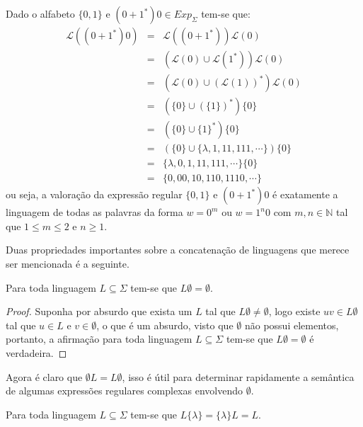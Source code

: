 \begin{exemplo}\label{exe:ValoracaoExpressao2}
	Dado o alfabeto $\{0,1\}$ e $(0 + 1^*)0 \in Exp_\Sigma$ tem-se que:
	\begin{eqnarray*}
		\mathcal{L}((0 + 1^*)0 ) & = & \mathcal{L}((0 + 1^*))\mathcal{L}(0)\\
		& = & (\mathcal{L}(0) \cup  \mathcal{L}(1^*))\mathcal{L}(0)\\
    & = & (\mathcal{L}(0) \cup  (\mathcal{L}(1))^*)\mathcal{L}(0)\\
    & = & (\{0\} \cup  (\{1\})^*)\{0\}\\
    & = & (\{0\} \cup  \{1\}^*)\{0\}\\
    & = & (\{0\} \cup  \{\lambda, 1, 11, 111, \cdots\})\{0\}\\
    & = & \{\lambda, 0, 1, 11, 111, \cdots\}\{0\}\\
    & = & \{0, 00, 10, 110, 1110, \cdots\}
	\end{eqnarray*}
	ou seja, a valoração da expressão regular $\{0,1\}$ e $(0 + 1^*)0$ é exatamente a linguagem de todas as palavras da forma $w = 0^m$ ou $w = 1^n0$ com $m,n \in \mathbb{N}$ tal que $1 \leq m \leq 2$ e $n \geq 1$.
\end{exemplo}

Duas propriedades importantes sobre a concatenação de linguagens que merece ser mencionada é a seguinte.

\begin{teorema}
  Para toda linguagem $L \subseteq \Sigma$ tem-se que $L\emptyset = \emptyset$.
\end{teorema}

\begin{proof}
  Suponha por absurdo que exista um $L$ tal que $L\emptyset \neq \emptyset$, logo existe $uv \in L\emptyset$ tal que $u \in L$ e $v \in \emptyset$, o que é um absurdo, visto que $\emptyset$ não possui elementos, portanto, a afirmação para toda linguagem $L \subseteq \Sigma$ tem-se que $L\emptyset = \emptyset$ é verdadeira.
\end{proof}

\begin{dica}
  Agora é claro que $\emptyset L = L\emptyset$, isso é útil para determinar rapidamente a semântica de algumas expressões regulares complexas envolvendo $\emptyset$.
\end{dica}

\begin{teorema}
  Para toda linguagem $L \subseteq \Sigma$ tem-se que $L\{\lambda\} = \{\lambda\}L = L$.
\end{teorema}

